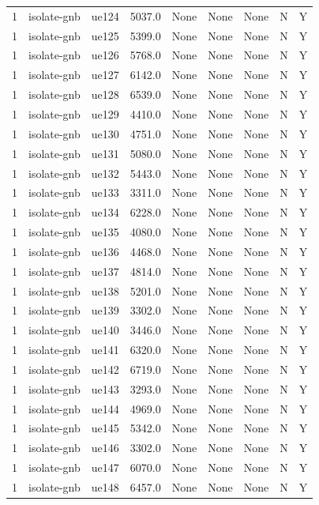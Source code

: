 \begin{table}[ht]
\begin{tabular}{|c|c|c|c|c|c|c|c|c|}
1 & isolate-gnb & ue124 & 5037.0 & None & None & None & N & Y \\
1 & isolate-gnb & ue125 & 5399.0 & None & None & None & N & Y \\
1 & isolate-gnb & ue126 & 5768.0 & None & None & None & N & Y \\
1 & isolate-gnb & ue127 & 6142.0 & None & None & None & N & Y \\
1 & isolate-gnb & ue128 & 6539.0 & None & None & None & N & Y \\
1 & isolate-gnb & ue129 & 4410.0 & None & None & None & N & Y \\
1 & isolate-gnb & ue130 & 4751.0 & None & None & None & N & Y \\
1 & isolate-gnb & ue131 & 5080.0 & None & None & None & N & Y \\
1 & isolate-gnb & ue132 & 5443.0 & None & None & None & N & Y \\
1 & isolate-gnb & ue133 & 3311.0 & None & None & None & N & Y \\
1 & isolate-gnb & ue134 & 6228.0 & None & None & None & N & Y \\
1 & isolate-gnb & ue135 & 4080.0 & None & None & None & N & Y \\
1 & isolate-gnb & ue136 & 4468.0 & None & None & None & N & Y \\
1 & isolate-gnb & ue137 & 4814.0 & None & None & None & N & Y \\
1 & isolate-gnb & ue138 & 5201.0 & None & None & None & N & Y \\
1 & isolate-gnb & ue139 & 3302.0 & None & None & None & N & Y \\
1 & isolate-gnb & ue140 & 3446.0 & None & None & None & N & Y \\
1 & isolate-gnb & ue141 & 6320.0 & None & None & None & N & Y \\
1 & isolate-gnb & ue142 & 6719.0 & None & None & None & N & Y \\
1 & isolate-gnb & ue143 & 3293.0 & None & None & None & N & Y \\
1 & isolate-gnb & ue144 & 4969.0 & None & None & None & N & Y \\
1 & isolate-gnb & ue145 & 5342.0 & None & None & None & N & Y \\
1 & isolate-gnb & ue146 & 3302.0 & None & None & None & N & Y \\
1 & isolate-gnb & ue147 & 6070.0 & None & None & None & N & Y \\
1 & isolate-gnb & ue148 & 6457.0 & None & None & None & N & Y \\

\end{tabular}
\end{table}
